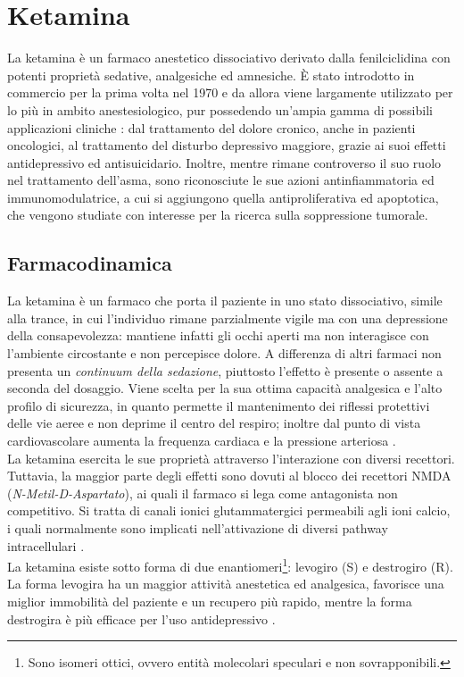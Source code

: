 \section{Ketamina}

La ketamina è un farmaco anestetico dissociativo derivato dalla fenilciclidina con potenti proprietà sedative, analgesiche ed amnesiche. \`E stato introdotto in commercio per la prima volta nel 1970 e da allora viene largamente utilizzato per lo più in ambito anestesiologico, pur possedendo un'ampia gamma di possibili applicazioni cliniche \cite{Ketamineapplication2019}: dal trattamento del dolore cronico, anche in pazienti oncologici, al trattamento del disturbo depressivo maggiore, grazie ai suoi effetti antidepressivo ed antisuicidario. Inoltre, mentre rimane controverso il suo ruolo nel trattamento dell'asma, sono riconosciute le sue azioni antinfiammatoria ed immunomodulatrice, a cui si aggiungono quella antiproliferativa ed apoptotica, che vengono studiate con interesse per la ricerca sulla soppressione tumorale.

\subsection*{Farmacodinamica}

La ketamina è un farmaco che porta il paziente in uno stato dissociativo, simile alla trance, in cui l'individuo rimane parzialmente vigile ma con una depressione della consapevolezza: mantiene infatti gli occhi aperti ma non interagisce con l'ambiente circostante e non percepisce dolore. A differenza di altri farmaci non presenta un \emph{continuum della sedazione}, piuttosto l'effetto è presente o assente a seconda del dosaggio. Viene scelta per la sua ottima capacità analgesica e l'alto profilo di sicurezza, in quanto permette il mantenimento dei riflessi protettivi delle vie aeree e non deprime il centro del respiro; inoltre dal punto di vista cardiovascolare aumenta la frequenza cardiaca e la pressione arteriosa \cite{Krauss2006}. 
\\La ketamina esercita le sue proprietà attraverso l'interazione con diversi recettori. Tuttavia, la maggior parte degli effetti sono dovuti al blocco dei recettori NMDA (\emph{N-Metil-D-Aspartato}), ai quali il farmaco si lega come antagonista non competitivo. Si tratta di canali ionici glutammatergici permeabili agli ioni calcio, i quali normalmente sono implicati nell'attivazione di diversi pathway intracellulari \cite{Zanos2018}.
\\La ketamina esiste sotto forma di due enantiomeri\footnote{Sono isomeri ottici, ovvero entità molecolari speculari e non sovrapponibili.}: levogiro (S) e destrogiro (R). La forma levogira ha un maggior attività anestetica ed analgesica, favorisce una miglior immobilità del paziente e un recupero più rapido, mentre la forma destrogira è più efficace per l'uso antidepressivo \cite{Simeupsedazione}.

